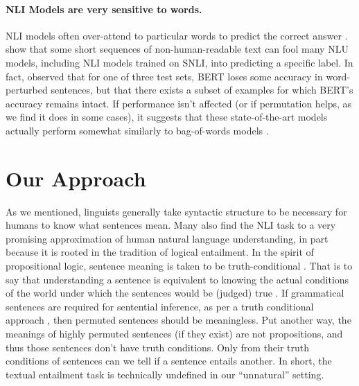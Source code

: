 \documentclass[11pt,a4paper]{article}
\begin{document}
\paragraph{NLI Models are very sensitive to words.} NLI models often over-attend to particular words to predict the correct answer \citep{gururangan-etal-2018-annotation, clark-etal-2019-bert}.  show that some short sequences of non-human-readable text can fool many NLU models, including NLI models trained on SNLI, into predicting a specific label. In fact,  observed that for one of three test sets, BERT loses some accuracy in word-perturbed sentences, but that there exists a subset of examples for which BERT’s accuracy remains intact. 
If performance isn't affected (or if permutation helps, as we find it does in some cases), it suggests that these state-of-the-art models actually perform somewhat similarly to bag-of-words models \cite{blei-etal-2003-latent, mikolov2013efficient}.   



\section{Our Approach}\label{sec:permutation}

As we mentioned, linguists generally take syntactic structure to be necessary for humans to know what sentences mean. Many also find the NLI task to a very promising approximation of human natural language understanding, in part because it is rooted in the tradition of logical entailment. In the spirit of propositional logic, sentence meaning is taken to be %
truth-conditional \citep{frege1948sense, montague-1970-universal, chierchia-mcconnell-1990-meaning, heim-kratzer-1998-semantics}. That is to say that understanding a sentence is equivalent to knowing the actual conditions of the world under which the sentences would be (judged) true \citep{wittgenstein-1922-tractatus}. If grammatical sentences are required for sentential inference, as per a truth conditional approach \citep{montague-1970-universal}, then permuted sentences should be meaningless. Put another way, the meanings of highly permuted sentences (if they exist) are not propositions, and thus those sentences don't have truth conditions. Only from their truth conditions of sentences can we tell if a sentence entails another. 
In short, the textual entailment task is technically undefined in our ``unnatural'' setting. %
\end{document}

